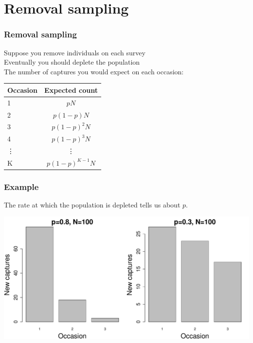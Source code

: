 \documentclass[color=usenames,dvipsnames]{beamer}\usepackage[]{graphicx}\usepackage[]{color}
\begin{document}


\section{Removal sampling}



\begin{frame}
  \frametitle{Removal sampling}
  \large
  { Suppose you remove individuals on each survey \\}
  \vfill
  \pause
  { Eventually you should deplete the population \\}
  \vfill
  \pause
  { The number of captures you would expect on each occasion:}
  \begin{center}
    \begin{tabular}{lc}
      \hline
      Occasion & Expected count \\
      \hline
      1 & $pN$ \\
      2 & $p(1-p)N$ \\
      3 & $p(1-p)^2N$ \\
      4 & $p(1-p)^3N$ \\
      \vdots & \vdots \\
      K & $p(1-p)^{K-1}N$ \\
      \hline
    \end{tabular}
  \end{center}
\end{frame}





\begin{frame}[fragile]
  \frametitle{Example}
  \begin{center}
    The rate at which the population is depleted tells us about $p$. \\
    \vfill


\includegraphics[width=\textwidth]{mark-recap-closedpop-rem}
 \end{center}
\end{frame}
\end{document}
